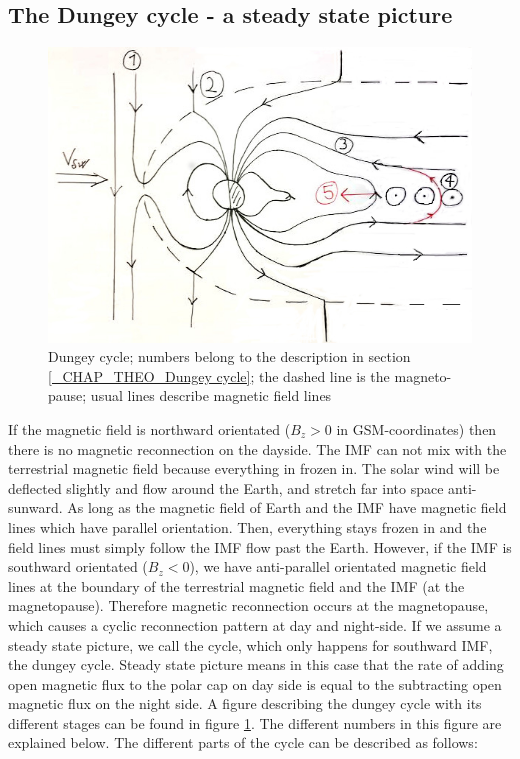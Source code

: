 \documentclass[10pt,a4paper]{article}
\begin{document}
\subsection{The Dungey cycle - a steady state picture \label{_CHAP_THEO_Dungey cycle}}

\begin{figure}[h]
\centering
\caption{Dungey cycle; numbers belong to the description in section \ref{_CHAP_THEO_Dungey cycle}; the dashed line is the magneto-pause; usual lines describe magnetic field lines}
\label{Dungey cycle}
\includegraphics[scale=0.5]{solvind.jpg}
\end{figure}
If the magnetic field is northward orientated ($B_z>0$ in GSM-coordinates) then there is no magnetic reconnection on the dayside. 
The IMF can not mix with the terrestrial magnetic field because everything in frozen in. The solar wind will be deflected slightly and 
flow around the Earth, and stretch far into space anti-sunward. As long as the magnetic field of Earth and the IMF have magnetic field lines which have parallel orientation.  
Then, everything stays frozen in and the field lines must simply follow the IMF flow past the Earth. However, if the IMF is southward orientated ($B_z<0$), we have anti-parallel orientated magnetic field lines at the boundary of the terrestrial magnetic field and the IMF (at the magnetopause). Therefore magnetic reconnection occurs at the magnetopause, which causes a cyclic reconnection pattern at day and night-side. If we assume a steady state picture, we call the cycle, which only happens for southward IMF, the dungey cycle. Steady state picture means in this case that the rate of adding open magnetic flux to the polar cap on day side is equal to the subtracting open magnetic flux on the night side. A figure describing the dungey cycle with its different stages can be found in figure \ref{Dungey cycle}. The different numbers in this figure are explained below. The different parts of the cycle can be described as follows:
\end{document}
